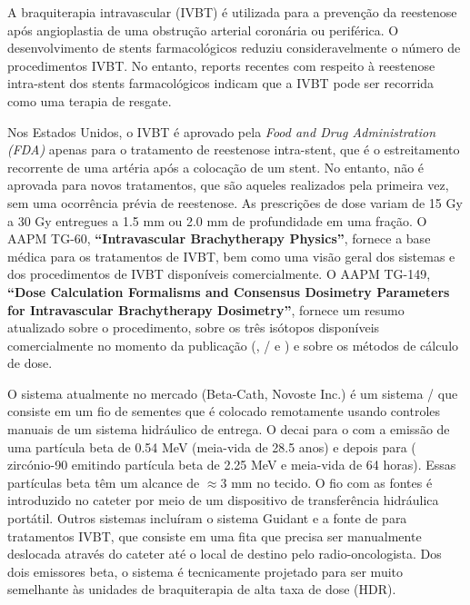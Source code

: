 \documentclass[11pt,a4paper]{article}
\begin{document}
    A braquiterapia intravascular (IVBT) é utilizada para a prevenção da reestenose após angioplastia de uma obstrução arterial coronária ou periférica. O desenvolvimento de stents farmacológicos reduziu consideravelmente o número de procedimentos IVBT. No entanto, reports recentes com respeito à reestenose intra-stent dos stents farmacológicos indicam que a IVBT pode ser recorrida como uma terapia de resgate. 

    Nos Estados Unidos, o IVBT é aprovado pela \textit{Food and Drug Administration (FDA)} apenas para o tratamento de reestenose intra-stent, que é o estreitamento recorrente de uma artéria após a colocação de um stent. No entanto, não é aprovada para novos tratamentos, que são aqueles realizados pela primeira vez, sem uma ocorrência prévia de reestenose. As prescrições de dose variam de 15 Gy a 30 Gy entregues a 1.5 mm ou 2.0 mm de profundidade em uma fração. O  AAPM TG-60, \textbf{``Intravascular Brachytherapy Physics''}, fornece a base médica para os tratamentos de IVBT, bem como uma visão geral dos sistemas e dos procedimentos de IVBT disponíveis comercialmente. O AAPM TG-149, \textbf{``Dose Calculation Formalisms and Consensus Dosimetry Parameters for Intravascular Brachytherapy Dosimetry''}, fornece um resumo atualizado sobre o procedimento, sobre os três isótopos disponíveis comercialmente no momento da publicação (, / e  ) e sobre os métodos de cálculo de dose.

    O sistema atualmente no mercado (Beta-Cath, Novoste Inc.) é um sistema / que consiste em um fio de sementes que é colocado remotamente usando controles manuais de um sistema hidráulico de entrega. O  decai para o  com a emissão de uma partícula beta de 0.54 MeV (meia-vida de 28.5 anos) e depois para  ( zircónio-90 emitindo partícula beta de 2.25 MeV e meia-vida de 64 horas). Essas partículas beta têm um alcance de $\approx$3 mm no tecido. O fio com as fontes é introduzido no cateter por meio de um dispositivo de transferência hidráulica portátil. Outros sistemas incluíram o sistema Guidant e a fonte de  para tratamentos IVBT, que consiste em uma fita que precisa ser manualmente deslocada através do cateter até o local de destino pelo radio-oncologista. Dos dois emissores beta, o sistema  é tecnicamente projetado para ser muito semelhante às unidades de braquiterapia de alta taxa de dose (HDR).
\end{document}
